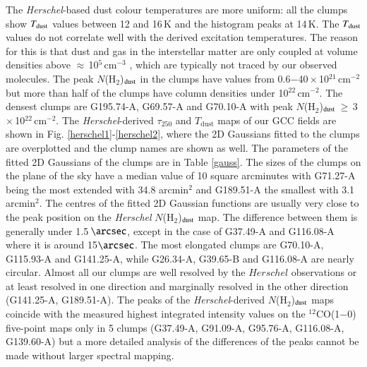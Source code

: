 \documentclass[printer]{aa}
\begin{document}
The \textit{Herschel}-based dust colour temperatures are more uniform: all the clumps show $T_{\rm dust}$ values between 12 and 16\,K and the histogram peaks at 14\,K. The $T_{\rm dust}$ values do not correlate well with the derived excitation temperatures. The reason for this is that dust and gas in the interstellar matter are only coupled at volume densities above $\approx$\,10$^{5}$\,cm$^{-3}$ \citep{goldsmith2001}, which are typically not traced by our observed molecules. The peak $N$(H$_2$)$_{\rm dust}$ in the clumps have values from 0.6$-$40\,$\times$\,10$^{21}$\,cm$^{-2}$ but more than half of the clumps have column densities under 10$^{22}$\,cm$^{-2}$. The densest clumps are G195.74-A, G69.57-A and G70.10-A with peak $N$(H$_2$)$_{\rm dust}$\,$\geq$\,3\,$\times$\,10$^{22}$\,cm$^{-2}$. The \textit{Herschel}-derived $\tau_{250}$ and $T\mathrm{_{dust}}$ maps of our GCC fields are shown in Fig. \ref{herschel1}-\ref{herschel2}, where the 2D Gaussians fitted to the clumps are overplotted and the clump names are shown as well. The parameters of the fitted 2D Gaussians of the clumps are in Table \ref{gauss}. The sizes of the clumps on the plane of the sky have a median value of 10 square arcminutes with G71.27-A being the most extended with 34.8 arcmin$^2$ and G189.51-A the smallest with 3.1 arcmin$^2$. The centres of the fitted 2D Gaussian functions are usually very close to the peak position on the \textit{Herschel} $N$(H$_2$)$_{\rm dust}$ map. The difference between them is generally under 1.5\,$\arcsec$, except in the case of G37.49-A and G116.08-A where it is around 15$\arcsec$. The most elongated clumps are G70.10-A, G115.93-A and G141.25-A, while G26.34-A, G39.65-B and G116.08-A are nearly circular. Almost all our clumps are well resolved by the $Herschel$ observations or at least resolved in one direction and marginally resolved in the other direction (G141.25-A, G189.51-A). The peaks of the \textit{Herschel}-derived $N$(H$_2$)$_{\rm dust}$ maps coincide with the measured highest integrated intensity values on the $^{12}$CO(1$-$0) five-point maps only in 5 clumps (G37.49-A, G91.09-A, G95.76-A, G116.08-A, G139.60-A) but a more detailed analysis of the differences of the peaks cannot be made without larger spectral mapping.
\end{document}
